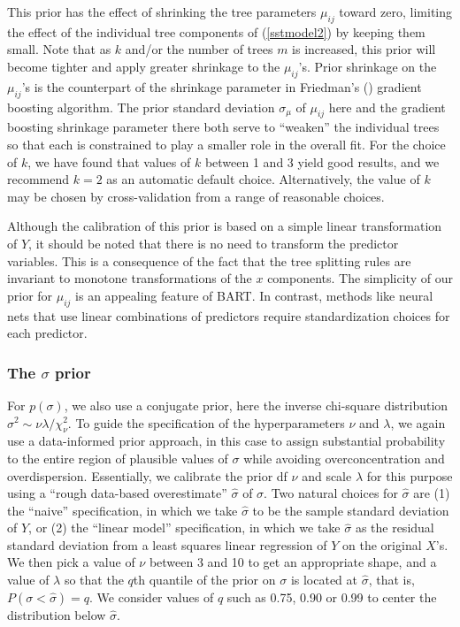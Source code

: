 \documentclass[aoas,nameyear,dvips]{arximspdf}
\begin{document}
This prior has the effect of shrinking the tree parameters
$\mu_{ij}$ toward zero, limiting the effect of the individual
tree components of (\ref{sstmodel2}) by keeping them small.  Note
that as $k$ and/or the number of trees $m$ is increased, this
prior will become tighter and apply greater shrinkage to the
$\mu_{ij}$'s.  Prior shrinkage on the $\mu_{ij}$'s is the
counterpart of the shrinkage parameter in
Friedman's (\citeyear{Fri2001}) gradient boosting algorithm.  The prior
standard deviation $\sigma_{\mu}$ of $\mu_{ij}$  here and the gradient
boosting shrinkage parameter there both serve to ``weaken'' the
individual trees so that each is constrained to play a smaller
role in the overall fit.  For the choice of $k$, we have found
that values of $k$ between 1 and 3 yield good results, and we
recommend $k = 2$ as an automatic default choice. Alternatively,
the value of $k$ may be chosen by cross-validation from a range of
reasonable choices.

Although the calibration of this prior is based on a simple linear
transformation of $Y$, it should be noted that there is no need to
transform the predictor variables.  This is a consequence of the
fact that the tree splitting rules are invariant to monotone
transformations of the $x$ components.   The simplicity of
our prior for $\mu_{ij}$ is an appealing feature of BART.
In contrast, methods like neural nets that use linear combinations
of predictors require standardization choices for each predictor.


\subsubsection{The $\sigma$ prior}\label{sec:sigmaprior}

For $p(\sigma)$, we also use a conjugate prior, here the inverse chi-square distribution
$\sigma^2 \sim \nu   \lambda/\chi_{\nu}^2.$  To guide the specification
of the hyperparameters $\nu$ and $\lambda$, we again use a data-informed prior approach,
in this case to assign substantial probability to the entire region of
plausible values of $\sigma$ while avoiding overconcentration and overdispersion.
Essentially, we calibrate the prior df $\nu$ and scale $\lambda$ for this purpose
using a ``rough data-based overestimate''
$\hat{\sigma}$ of $\sigma$.  Two natural choices for $\hat{\sigma}$ are (1) the ``naive''
specification, in which we take $\hat{\sigma}$ to be the sample
standard deviation of $Y$, or (2) the ``linear model''
specification, in which we take $\hat{\sigma}$ as the residual
standard deviation from a least squares linear regression of $Y$
on the original $X$'s.  We then pick a value of
$\nu$ between 3 and 10 to get an appropriate shape, and a value of
$\lambda$ so that the $q$th quantile of the prior on $\sigma$ is located at
$\hat{\sigma}$, that is, $P(\sigma < \hat{\sigma}) = q.$  We consider values of $q$ such as
0.75, 0.90 or 0.99 to center the distribution below $\hat{\sigma}$.
\end{document}
